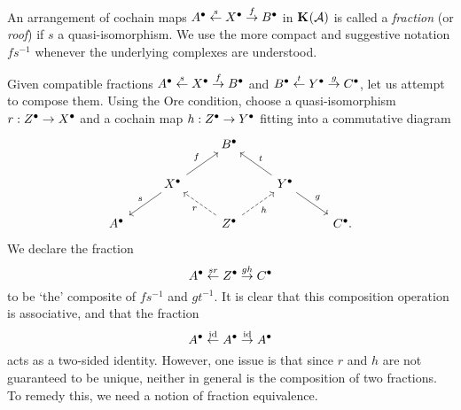 \begin{definition}
  An arrangement of cochain maps
  ${{{A}}^{\bullet}} \stackrel{{s}}{\leftarrow} {{{X}}^{\bullet}} \stackrel{{f}}{\rightarrow} {{{B}}^{\bullet}}$
  in ${\mathbf{K}}^{{}}({\mathcal{A}})$ is called a \emph{fraction} (or
  \emph{roof}) if $s$ a quasi-isomorphism.
  We use the more compact and suggestive notation $fs^{-1}$ whenever
  the underlying complexes are understood.
\end{definition}

Given compatible fractions
${{{A}}^{\bullet}} \stackrel{{s}}{\leftarrow} {{{X}}^{\bullet}} \stackrel{{f}}{\rightarrow} {{{B}}^{\bullet}}$
and
${{{B}}^{\bullet}} \stackrel{{t}}{\leftarrow} {{{Y}}^{\bullet}} \stackrel{{g}}{\rightarrow} {{{C}}^{\bullet}}$,
let us attempt to compose them.
Using the Ore condition, choose a quasi-isomorphism $r:
{{Z}}^{\bullet} \to {{X}}^{\bullet}$ and a cochain map $h:
{{Z}}^{\bullet} \to {{Y}}^{\bullet}$ fitting into a commutative diagram
\[
  \begin{tikzcd}
    && \cochaincomp{B} \\
    & \cochaincomp{X} && \cochaincomp{Y} \\
    \cochaincomp{A} && \cochaincomp{Z} && \cochaincomp{C}.
    \arrow["f", from=2-2, to=1-3]
    \arrow["s"', from=2-2, to=3-1]
    \arrow["t"', from=2-4, to=1-3]
    \arrow["g", from=2-4, to=3-5]
    \arrow["r", dashed, from=3-3, to=2-2]
    \arrow["h"', dashed, from=3-3, to=2-4]
  \end{tikzcd}
\]
We declare the fraction
\[
  {{{A}}^{\bullet}} \stackrel{{sr}}{\leftarrow} {{{Z}}^{\bullet}} \stackrel{{gh}}{\rightarrow} {{{C}}^{\bullet}}
\]
to be `the' composite of $fs^{-1}$ and $gt^{-1}$.
It is clear that this composition operation is associative, and that
the fraction
\[
  {{{A}}^{\bullet}} \stackrel{{\operatorname{id}}}{\leftarrow} {{{A}}^{\bullet}} \stackrel{{\operatorname{id}}}{\rightarrow} {{{A}}^{\bullet}}
\]
acts as a two-sided identity.
However, one issue is that since $r$ and $h$ are not guaranteed to be
unique, neither in general is the composition of two fractions.
To remedy this, we need a notion of fraction equivalence.

